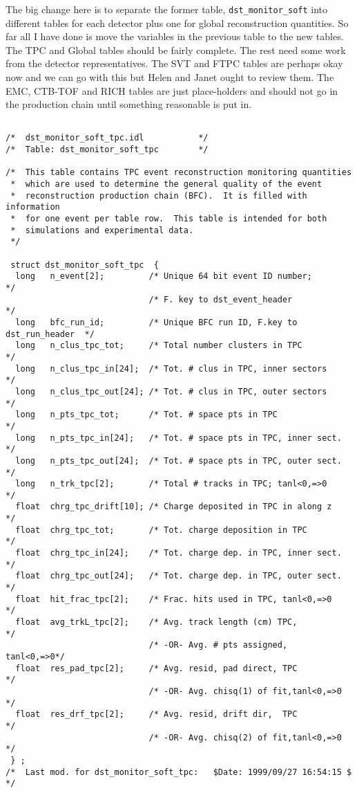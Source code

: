 \vspace{0.1in}
\vspace{0.05in}

The big change here is to separate the former table, {\tt dst\_monitor\_soft}
into different tables for each detector plus one for global reconstruction
quantities.  So far all I have done is move the variables in the previous
table to the new tables.  The TPC and Global tables should be
fairly complete.   The rest need some work from the detector representatives.
The SVT and FTPC tables are perhaps okay now and we can go with this but
Helen and Janet ought to review them.  The EMC, CTB-TOF and RICH tables
are just place-holders and should not go in the production chain until 
something reasonable is put in.

\begin{verbatim}

/*  dst_monitor_soft_tpc.idl           */
/*  Table: dst_monitor_soft_tpc        */

/*  This table contains TPC event reconstruction monitoring quantities
 *  which are used to determine the general quality of the event
 *  reconstruction production chain (BFC).  It is filled with information
 *  for one event per table row.  This table is intended for both
 *  simulations and experimental data.
 */

 struct dst_monitor_soft_tpc  {
  long   n_event[2];         /* Unique 64 bit event ID number;       */
                             /* F. key to dst_event_header           */
  long   bfc_run_id;         /* Unique BFC run ID, F.key to dst_run_header  */
  long   n_clus_tpc_tot;     /* Total number clusters in TPC         */
  long   n_clus_tpc_in[24];  /* Tot. # clus in TPC, inner sectors    */
  long   n_clus_tpc_out[24]; /* Tot. # clus in TPC, outer sectors    */
  long   n_pts_tpc_tot;      /* Tot. # space pts in TPC              */
  long   n_pts_tpc_in[24];   /* Tot. # space pts in TPC, inner sect. */
  long   n_pts_tpc_out[24];  /* Tot. # space pts in TPC, outer sect. */
  long   n_trk_tpc[2];       /* Total # tracks in TPC; tanl<0,=>0    */
  float  chrg_tpc_drift[10]; /* Charge deposited in TPC in along z   */
  float  chrg_tpc_tot;       /* Tot. charge deposition in TPC        */
  float  chrg_tpc_in[24];    /* Tot. charge dep. in TPC, inner sect. */
  float  chrg_tpc_out[24];   /* Tot. charge dep. in TPC, outer sect. */
  float  hit_frac_tpc[2];    /* Frac. hits used in TPC, tanl<0,=>0   */
  float  avg_trkL_tpc[2];    /* Avg. track length (cm) TPC,          */
                             /* -OR- Avg. # pts assigned,  tanl<0,=>0*/
  float  res_pad_tpc[2];     /* Avg. resid, pad direct, TPC          */
                             /* -OR- Avg. chisq(1) of fit,tanl<0,=>0 */
  float  res_drf_tpc[2];     /* Avg. resid, drift dir,  TPC          */
                             /* -OR- Avg. chisq(2) of fit,tanl<0,=>0 */
 } ;
/*  Last mod. for dst_monitor_soft_tpc:   $Date: 1999/09/27 16:54:15 $ */





\end{verbatim}
